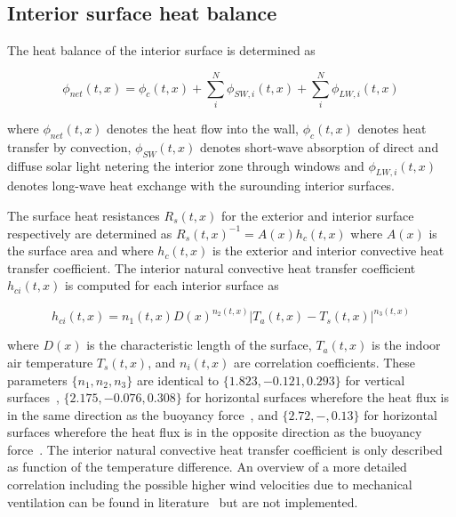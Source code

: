 \subsection{Interior surface heat balance}
\label{sec:int}

The heat balance of the interior surface is determined as 

\begin{equation} \label{eq:intersurf}
\phi_{net}(t,x) = \phi_{c}(t,x) + \sum_{i}^{N} \phi_{SW,i}(t,x) + \sum_{i}^{N} \phi_{LW,i}(t,x)
\end{equation}


where $\phi_{net}(t,x)$ denotes the heat flow into the wall, $\phi_{c}(t,x)$ denotes heat transfer by convection, $\phi_{SW}(t,x)$ denotes short-wave absorption of direct and diffuse solar light netering the interior zone through windows and  $\phi_{LW,i}(t,x)$ denotes long-wave heat exchange with the surounding interior surfaces.

 The surface heat resistances $R_{s}(t,x)$ for the exterior and interior surface respectively are determined as $R_{s}(t,x)^{-1}=A(x)h_{c}(t,x)$ where $A(x)$ is the surface area and where $h_{c}(t,x)$ is the exterior and interior convective heat transfer coefficient. The interior natural convective heat transfer coefficient $h_{ci}(t,x)$ is computed for each interior surface as

\begin{equation}
h_{ci}(t,x) = n_{1}(t,x) D(x)^{n_{2}(t,x)} \left|T_{a}(t,x)-T_{s}(t,x)\right|^{n_{3}(t,x)}
\end{equation}

where $D(x)$ is the characteristic length of the surface, $T_{a}(t,x)$ is the indoor air temperature $T_{s}(t,x)$, and $n_{i}(t,x)$ are correlation coefficients. These parameters $\{n_{1},n_{2},n_{3}\}$ are identical to $\{1.823,-0.121,0.293\}$ for vertical surfaces~\cite{Khalifa2001}, $\{2.175,-0.076,0.308\}$ for horizontal surfaces wherefore the heat flux is in the same direction as the buoyancy force~\cite{Khalifa2001}, and $\{2.72,-,0.13\}$ for horizontal surfaces wherefore the heat flux is in the opposite direction as the buoyancy force~\cite{Awbi1999}. The interior natural convective heat transfer coefficient is only described as function of the temperature difference. An overview of a more detailed correlation including the possible higher wind velocities due to mechanical ventilation can be found in literature~\cite{Beausoleil-Morrison2000} but are not implemented.

